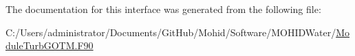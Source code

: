 The documentation for this interface was generated from the following file\+:\begin{DoxyCompactItemize}
\item 
C\+:/\+Users/administrator/\+Documents/\+Git\+Hub/\+Mohid/\+Software/\+M\+O\+H\+I\+D\+Water/\mbox{\hyperlink{_module_turb_g_o_t_m_8_f90}{Module\+Turb\+G\+O\+T\+M.\+F90}}\end{DoxyCompactItemize}
